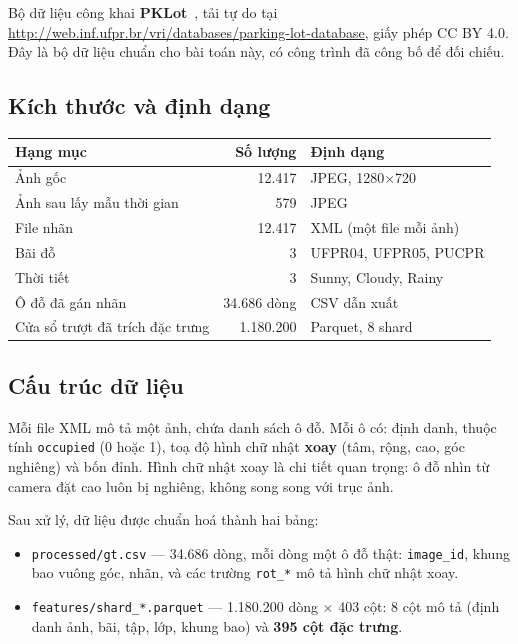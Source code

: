 \documentclass[12pt]{ai_conquer2026}
\begin{document}
Bộ dữ liệu công khai \textbf{PKLot}~\cite{pklot}, tải tự do tại \url{http://web.inf.ufpr.br/vri/databases/parking-lot-database}, giấy phép CC BY 4.0. Đây là bộ dữ liệu chuẩn cho bài toán này, có công trình đã công bố để đối chiếu.

\subsection{Kích thước và định dạng}

\begin{center}
\begin{tabular}{|l|r|l|}
\hline
\textbf{Hạng mục} & \textbf{Số lượng} & \textbf{Định dạng} \\
\hline
Ảnh gốc & 12.417 & JPEG, 1280$\times$720 \\
Ảnh sau lấy mẫu thời gian & 579 & JPEG \\
File nhãn & 12.417 & XML (một file mỗi ảnh) \\
Bãi đỗ & 3 & UFPR04, UFPR05, PUCPR \\
Thời tiết & 3 & Sunny, Cloudy, Rainy \\
Ô đỗ đã gán nhãn & 34.686 dòng & CSV dẫn xuất \\
Cửa sổ trượt đã trích đặc trưng & 1.180.200 & Parquet, 8 shard \\
\hline
\end{tabular}
\end{center}

\subsection{Cấu trúc dữ liệu}

Mỗi file XML mô tả một ảnh, chứa danh sách ô đỗ. Mỗi ô có: định danh, thuộc tính \texttt{occupied} (0 hoặc 1), toạ độ hình chữ nhật \textbf{xoay} (tâm, rộng, cao, góc nghiêng) và bốn đỉnh. Hình chữ nhật xoay là chi tiết quan trọng: ô đỗ nhìn từ camera đặt cao luôn bị nghiêng, không song song với trục ảnh.

Sau xử lý, dữ liệu được chuẩn hoá thành hai bảng:

\begin{itemize}
\item \texttt{processed/gt.csv} --- 34.686 dòng, mỗi dòng một ô đỗ thật: \texttt{image\_id}, khung bao vuông góc, nhãn, và các trường \texttt{rot\_*} mô tả hình chữ nhật xoay.
\item \texttt{features/shard\_*.parquet} --- 1.180.200 dòng $\times$ 403 cột: 8 cột mô tả (định danh ảnh, bãi, tập, lớp, khung bao) và \textbf{395 cột đặc trưng}.
\end{itemize}
\end{document}
